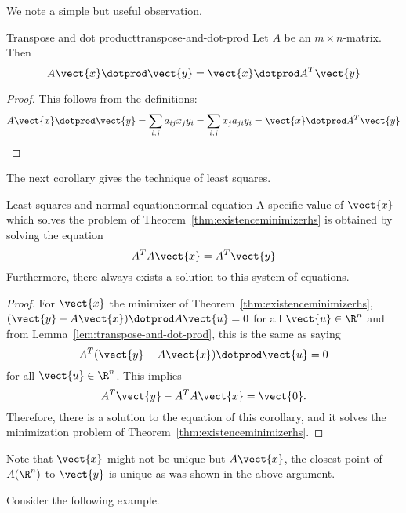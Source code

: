 We note a simple but useful observation.

\begin{lemma}{Transpose and dot product}{transpose-and-dot-prod}
Let $A$ be an $m\times n$-matrix. Then 
\begin{equation*}
A\vect{x} \dotprod \vect{y} = \vect{x}\dotprod A^T\vect{y} 
\end{equation*}
\end{lemma}

\begin{proof}
This follows from the definitions:
\[ A\vect{x} \dotprod \vect{y}=\sum_{i,j}a_{ij}x_{j} y_{i}
=\sum_{i,j}x_{j} a_{ji} y_{i}= \vect{x} \dotprod A^T\vect{y}
\] \end{proof}

The next corollary gives the technique of least squares.

\begin{corollary}{Least squares and normal equation}{normal-equation}
A specific value of $\vect{x}$ which solves the problem of Theorem~\ref{thm:existenceminimizerhs} is obtained by solving the equation
\begin{equation*}
A^TA\vect{x}=A^T\vect{y}
\end{equation*}
Furthermore, there always exists a solution to this system of equations.
\end{corollary}

\begin{proof} 
For $\vect{x}$ the minimizer of Theorem~\ref{thm:existenceminimizerhs}, $(
\vect{y}-A\vect{x}) \dotprod A \vect{u} =0$ for all $\vect{u} \in \R^{n}$ and from
Lemma~\ref{lem:transpose-and-dot-prod}, this is the same as saying
\begin{equation*}
A^T(\vect{y}-A\vect{x}) \dotprod \vect{u}=0
\end{equation*}
for all $\vect{u} \in \R^{n}$. This implies 
\begin{equation*}
A^T\vect{y}-A^TA\vect{x}=\vect{0}.
\end{equation*}
Therefore, there is a solution to the equation of this corollary, and it
solves the minimization problem of Theorem~\ref{thm:existenceminimizerhs}.
\end{proof}

Note that $\vect{x}$ might not be unique but $A\vect{x}$, the closest
point of $A(\R^{n})$ to $\vect{y}$ is unique as was shown in the
above argument. 

Consider the following example. 

